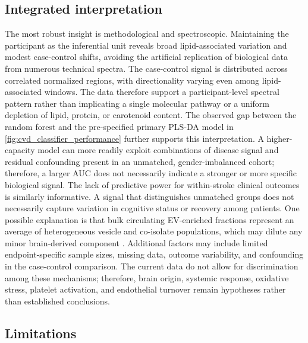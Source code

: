 \documentclass[preprint,12pt]{elsarticle}
\begin{document}
\subsection{Integrated interpretation} 
\label{subsec:interpretation}

The most robust insight is methodological and spectroscopic. Maintaining the participant as the inferential unit reveals broad lipid-associated variation and modest case-control shifts, avoiding the artificial replication of biological data from numerous technical spectra. The case-control signal is distributed across correlated normalized regions, with directionality varying even among lipid-associated windows. The data therefore support a participant-level spectral pattern rather than implicating a single molecular pathway or a uniform depletion of lipid, protein, or carotenoid content. The observed gap between the random forest and the pre-specified primary PLS-DA model in \cref{fig:cvd_classifier_performance} further supports this interpretation. A higher-capacity model can more readily exploit combinations of disease signal and residual confounding present in an unmatched, gender-imbalanced cohort; therefore, a larger AUC does not necessarily indicate a stronger or more specific biological signal.
%
The lack of predictive power for within-stroke clinical outcomes is similarly informative. A signal that distinguishes unmatched groups does not necessarily capture variation in cognitive status or recovery among patients. One possible explanation is that bulk circulating EV-enriched fractions represent an average of heterogeneous vesicle and co-isolate populations, which may dilute any minor brain-derived component \cite{liu2025}. Additional factors may include limited endpoint-specific sample sizes, missing data, outcome variability, and confounding in the case-control comparison. The current data do not allow for discrimination among these mechanisms; therefore, brain origin, systemic response, oxidative stress, platelet activation, and endothelial turnover remain hypotheses rather than established conclusions.

\subsection{Limitations} 
\label{subsec:limitations}
\end{document}
